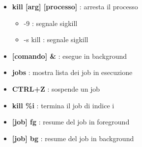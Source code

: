 \documentclass{article}
\begin{document}
\begin{itemize}
\begin{itemize}
            \item \textbf{kill [arg] [processo]} : arresta il processo
            \begin{itemize} %
                \item -9 : segnale sigkill
                \item -s kill : segnale sigkill
            \end{itemize} %
            \item \textbf{[comando] \&} : esegue in background
            \item \textbf{jobs} : mostra lista dei job in esecuzione
            \item \textbf{CTRL+Z} : sospende un job
            \item \textbf{kill \%i} : termina il job di indice i
            \item \textbf{[job] fg} : resume del job in foreground
            \item \textbf{[job] bg} : resume del job in background
            
        \end{itemize} %
\end{itemize} %
\end{document}
